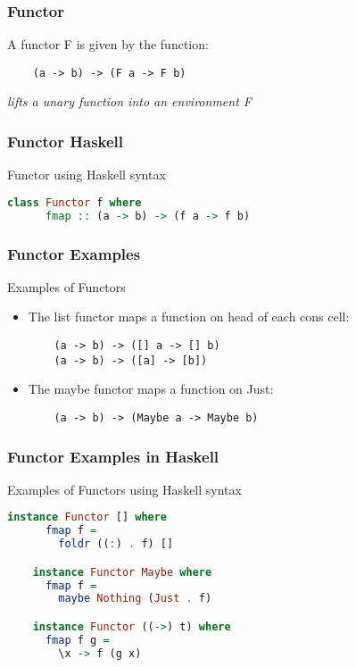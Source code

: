 \begin{frame}[fragile]
\frametitle{Functor}
\begin{block}{A functor F is given by the function:}
\begin{lstlisting}
    (a -> b) -> (F a -> F b)
\end{lstlisting}
\end{block}
\emph{lifts a unary function into an environment F}
\end{frame}

\begin{frame}[fragile]
\frametitle{Functor Haskell}
\begin{block}{Functor using Haskell syntax}
\begin{lstlisting}[language=haskell]
    class Functor f where
      fmap :: (a -> b) -> (f a -> f b)
\end{lstlisting}
\end{block}
\end{frame}

\begin{frame}[fragile]
\frametitle{Functor Examples}
\begin{block}{Examples of Functors}
\begin{itemize}
  \item The list functor maps a function on head of each cons cell:
    \begin{lstlisting}
    (a -> b) -> ([] a -> [] b)
    (a -> b) -> ([a] -> [b])
    \end{lstlisting}
  \item The maybe functor maps a function on Just:
    \begin{lstlisting}
    (a -> b) -> (Maybe a -> Maybe b)
    \end{lstlisting}    
\end{itemize}
\end{block}
\end{frame}

\begin{frame}[fragile]
\frametitle{Functor Examples in Haskell}
\begin{block}{Examples of Functors using Haskell syntax}
\begin{lstlisting}[language=haskell]
    instance Functor [] where
      fmap f =
        foldr ((:) . f) []

    instance Functor Maybe where
      fmap f =
        maybe Nothing (Just . f)

    instance Functor ((->) t) where
      fmap f g =
        \x -> f (g x)
\end{lstlisting}
\end{block}
\end{frame}
